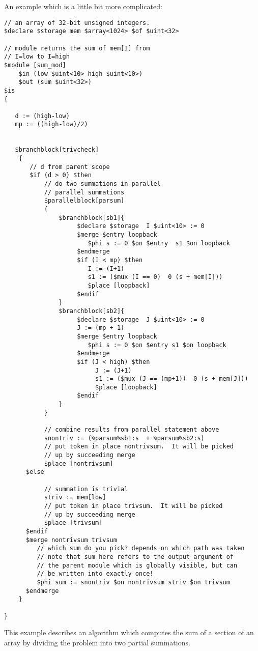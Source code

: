 \documentclass{article}
\begin{document}
An example which is a little bit more complicated:
\begin{verbatim}
// an array of 32-bit unsigned integers.
$declare $storage mem $array<1024> $of $uint<32> 

// module returns the sum of mem[I] from
// I=low to I=high
$module [sum_mod]
    $in (low $uint<10> high $uint<10>)
    $out (sum $uint<32>)
$is
{
 
   d := (high-low)  
   mp := ((high-low)/2)


   $branchblock[trivcheck]
    {
       // d from parent scope
       $if (d > 0) $then  
           // do two summations in parallel
           // parallel summations
           $parallelblock[parsum]
           {
               $branchblock[sb1]{
                    $declare $storage  I $uint<10> := 0
                    $merge $entry loopback
                       $phi s := 0 $on $entry  s1 $on loopback
                    $endmerge
                    $if (I < mp) $then
                       I := (I+1)
                       s1 := ($mux (I == 0)  0 (s + mem[I]))
                       $place [loopback]
                    $endif
               } 
               $branchblock[sb2]{
                    $declare $storage  J $uint<10> := 0
                    J := (mp + 1)
                    $merge $entry loopback
                       $phi s := 0 $on $entry s1 $on loopback
                    $endmerge
                    $if (J < high) $then
                         J := (J+1)
                         s1 := ($mux (J == (mp+1))  0 (s + mem[J]))
                         $place [loopback]
                    $endif
               } 
           }
 
           // combine results from parallel statement above
           snontriv := (%parsum%sb1:s  + %parsum%sb2:s)
           // put token in place nontrivsum.  It will be picked
           // up by succeeding merge
           $place [nontrivsum]
      $else

           // summation is trivial 
           striv := mem[low]
           // put token in place trivsum.  It will be picked
           // up by succeeding merge
           $place [trivsum]
      $endif
      $merge nontrivsum trivsum
         // which sum do you pick? depends on which path was taken
         // note that sum here refers to the output argument of 
         // the parent module which is globally visible, but can
         // be written into exactly once!
         $phi sum := snontriv $on nontrivsum striv $on trivsum
      $endmerge
    }

}
\end{verbatim}
This example describes an algorithm which computes the sum of
a section of an array by dividing the problem into two partial
summations. 
\end{document}
